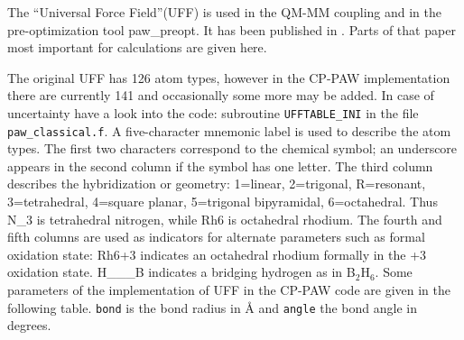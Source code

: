 \documentclass[final,12pt,makeidx,DIV=calc]{article}
\begin{document}
{{{The ``Universal Force Field''(UFF)\cite{rappe92_jacs114_10024} is used
in the QM-MM coupling and in the pre-optimization tool paw\_preopt. It
has been published in \cite{rappe92_jacs114_10024}. Parts of that
paper most important for calculations are given here.

The original UFF has 126 atom types, however in the CP-PAW
implementation there are currently 141 and occasionally some more may
be added. In case of uncertainty have a look into the code: subroutine
\texttt{UFFTABLE\_INI} in the file \texttt{paw\_classical.f}. A
five-character mnemonic label is used to describe the atom types. The
first two characters correspond to the chemical symbol; an underscore
appears in the second column if the symbol has one letter. The third
column describes the hybridization or geometry: 1=linear, 2=trigonal,
R=resonant, 3=tetrahedral, 4=square planar, 5=trigonal bipyramidal,
6=octahedral. Thus N\_3 is tetrahedral nitrogen, while Rh6 is
octahedral rhodium. The fourth and fifth columns are used as indicators
for alternate parameters such as formal oxidation state: Rh6+3
indicates an octahedral rhodium formally in the +3 oxidation
state. H\_\_\_B indicates a bridging hydrogen as in B$_2$H$_6$.  Some
parameters of the implementation of UFF in the CP-PAW code are given
in the following table. \verb'bond' is the bond radius in \AA{} and
\verb'angle' the bond angle in degrees.

}}}
\end{document}
